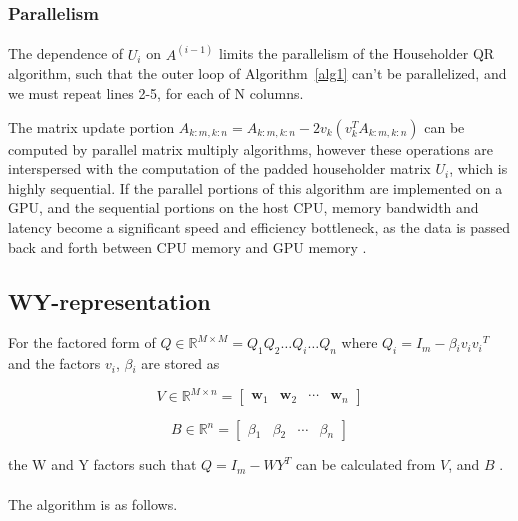 \documentclass{article}
\begin{document}
\subsubsection{Parallelism}
\paragraph{}
The dependence of $U_i$ on $A^{(i-1)}$ limits the parallelism of the Householder QR algorithm, such that the outer loop of Algorithm~\ref{alg1} can't be parallelized, and we must repeat lines 2-5, for each of N columns.

The matrix update portion $A_{k:m,k:n} = A_{k:m,k:n}-2v_{k}(v_{k}^{T}A_{k:m,k:n})$ can be computed by parallel matrix multiply algorithms, however these operations are interspersed with the computation of the padded householder matrix $U_i$, which is highly sequential. If the parallel portions of this algorithm are implemented on a GPU, and the sequential portions on the host CPU, memory bandwidth and latency become a significant speed and efficiency bottleneck, as the data is passed back and forth between CPU memory and GPU memory \cite{doi:10.1137/19M1296367} \cite{BISCHOFC1987TWrf}.

\subsection{WY-representation}

For the factored form of $Q \in \mathbb{R}^{M \times M} = {Q_1}{Q_2}{\dots}{Q_i}{\dots}{Q_n}$ where $Q_i = {I_m} - {\beta{}_i}{v_i}{v_i}^T$ and the factors ${v_i}$, ${\beta{}_i}$ are stored as  

\begin{equation}
V \in \mathbb{R}^{M \times n} =
\begin{bmatrix}
\mathbf{w}_1 & \mathbf{w}_2 & \cdots & \mathbf{w}_{n}
\end{bmatrix}
\end{equation}

\begin{equation}
B \in \mathbb{R}^{n} = 
\begin{bmatrix}
\beta{}_1 & \beta{}_2 & \cdots & \beta{}_{n}
\end{bmatrix}
\end{equation}

 the W and Y factors such that $Q = I_m - {W}{Y}^T$ can be calculated from $V$, and $B$ \cite{golub} \cite{doi:10.1137/19M1296367}.

\paragraph{}
The algorithm is as follows.
\end{document}
